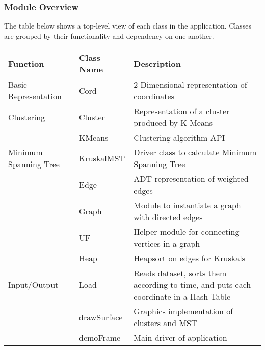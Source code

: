 \documentclass[12pt]{article}
\begin{document}
\subsubsection{Module Overview}
The table below shows a top-level view of each class in the application. Classes are grouped
by their functionality and dependency on one another.
\begin{table}[h]
\begin{tabularx}{\textwidth}{|l|l|X|}
\hline
\textbf{Function} & \textbf{Class Name} & \textbf{Description}\\
\hline
Basic Representation & Cord & 2-Dimensional representation of coordinates\\
\hline
Clustering & Cluster & Representation of a cluster produced by K-Means\\
\cline{2-3}
~ & KMeans & Clustering algorithm API\\
\hline
Minimum Spanning Tree & KruskalMST & Driver class to calculate Minimum
                                     Spanning Tree\\
\cline{2-3}
~ & Edge & ADT representation of weighted edges\\
\cline{2-3}
~ & Graph & Module to instantiate a graph with directed edges\\
\cline{2-3}
~ & UF & Helper module for connecting vertices in a graph\\
\cline{2-3}
~ & Heap & Heapsort on edges for Kruskals\\
\hline
Input/Output & Load & Reads dataset, sorts them according to time,
                      and puts each coordinate in a Hash Table\\
\cline{2-3}
~ & drawSurface & Graphics implementation of clusters and MST\\
\cline{2-3}
~ & demoFrame & Main driver of application\\
\hline
\end{tabularx}
\end{table}

\newpage
\end{document}
